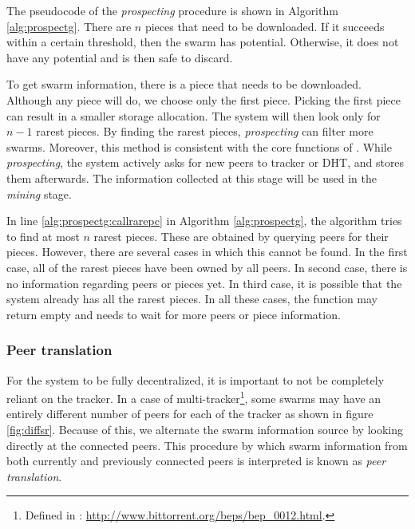 The pseudocode of the \textit{prospecting} procedure is shown in Algorithm \ref{alg:prospectg}. There are $n$ pieces that need to be downloaded. If it succeeds within a certain threshold, then the swarm has potential. Otherwise, it does not have any potential and is then safe to discard. 

To get swarm information, there is a piece that needs to be downloaded. Although any piece will do, we choose only the first piece. Picking the first piece can result in a smaller storage allocation. The system will then look only for $n - 1$ rarest pieces. By finding the rarest pieces, \textit{prospecting} can filter more swarms. Moreover, this method is consistent with the core functions of \bt. While \textit{prospecting}, the system actively asks for new peers to tracker or DHT, and stores them afterwards. The information collected at this stage will be used in the \textit{mining} stage. 


In line \ref{alg:prospectg:callrarepc} in Algorithm \ref{alg:prospectg}, the algorithm tries to find  at most $n$ rarest pieces. These are obtained by querying peers for their pieces. However, there are several cases in which this cannot be found. In the first case, all of the rarest pieces have been owned by all peers. In second case, there is no information regarding peers or pieces yet. In third case, it is possible that the system already has all the rarest pieces. In all these cases, the function may return empty and needs to wait for more peers or piece information.

\subsubsection{Peer translation}
For the system to be fully decentralized, it is important to not be completely reliant on the tracker. In a case of multi-tracker\footnote{Defined in : \url{http://www.bittorrent.org/beps/bep_0012.html}.}, some swarms may have an entirely different number of peers for each of the tracker as shown in figure \ref{fig:diffsr}. Because of this, we alternate the swarm information source by looking directly at the connected peers. This procedure by which swarm information from both currently and previously connected peers is interpreted is known as \textit{peer translation}. 

